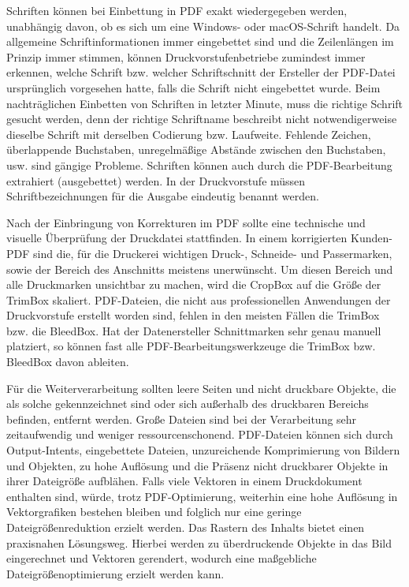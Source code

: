 \par
Schriften können bei Einbettung in PDF exakt wiedergegeben werden, unabhängig davon, ob es sich um eine Windows- oder macOS-Schrift handelt. Da allgemeine Schriftinformationen immer eingebettet sind und die Zeilenlängen im Prinzip immer stimmen, können Druckvorstufenbetriebe zumindest immer erkennen, welche Schrift bzw. welcher Schriftschnitt der Ersteller der PDF-Datei ursprünglich vorgesehen hatte, falls die Schrift nicht eingebettet wurde. Beim nachträglichen Einbetten von Schriften in letzter Minute, muss die richtige Schrift gesucht werden, denn der richtige Schriftname beschreibt nicht notwendigerweise dieselbe Schrift mit derselben Codierung bzw. Laufweite. Fehlende Zeichen, überlappende Buchstaben, unregelmäßige Abstände zwischen den Buchstaben, usw. sind gängige Probleme. Schriften können auch durch die PDF-Bearbeitung extrahiert (ausgebettet) werden. In der Druckvorstufe müssen Schriftbezeichnungen für die Ausgabe eindeutig benannt werden.
\par
Nach der Einbringung von Korrekturen im PDF sollte eine technische und visuelle Überprüfung der Druckdatei stattfinden. In einem korrigierten Kunden-PDF sind die, für die Druckerei wichtigen Druck-, Schneide- und Passermarken, sowie der Bereich des Anschnitts meistens unerwünscht. Um diesen Bereich und alle Druckmarken unsichtbar zu machen, wird die CropBox auf die Größe der TrimBox skaliert. PDF-Dateien, die nicht aus professionellen Anwendungen der Druckvorstufe erstellt worden sind, fehlen in den meisten Fällen die TrimBox bzw. die BleedBox. Hat der Datenersteller Schnittmarken sehr genau manuell platziert, so können fast alle PDF-Bearbeitungswerkzeuge die TrimBox bzw. BleedBox davon ableiten. 
\par
Für die Weiterverarbeitung sollten leere Seiten und nicht druckbare Objekte, die als solche gekennzeichnet sind oder sich außerhalb des druckbaren Bereichs befinden, entfernt werden. Große Dateien sind bei der Verarbeitung sehr zeitaufwendig und weniger ressourcenschonend. PDF-Dateien können sich durch Output-Intents, eingebettete Dateien, unzureichende Komprimierung von Bildern und Objekten, zu hohe Auflösung und die Präsenz nicht druckbarer Objekte in ihrer Dateigröße aufblähen. Falls viele Vektoren in einem Druckdokument enthalten sind, würde, trotz PDF-Optimierung, weiterhin eine hohe Auflösung in Vektorgrafiken bestehen bleiben und folglich nur eine geringe Dateigrößenreduktion erzielt werden. Das Rastern des Inhalts bietet einen praxisnahen Lösungsweg. Hierbei werden zu überdruckende Objekte in das Bild eingerechnet und Vektoren gerendert, wodurch eine maßgebliche Dateigrößenoptimierung erzielt werden kann. 
